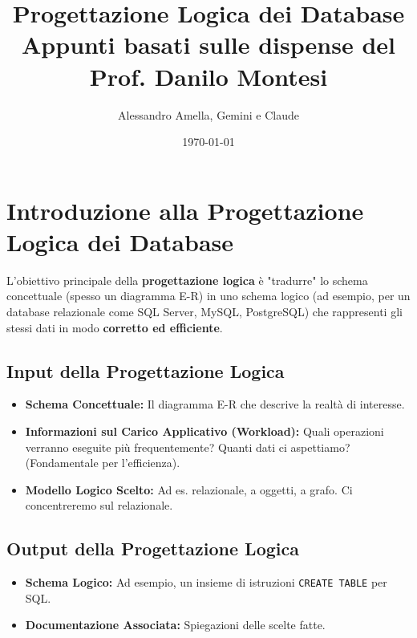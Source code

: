 

\usepackage{hyperref}

\title{Progettazione Logica dei Database\\
  \large Appunti basati sulle dispense del Prof. Danilo Montesi}
\author{Alessandro Amella, Gemini e Claude}
\date{\today}


	
	\maketitle
	\tableofcontents
	\newpage
	
	\section{Introduzione alla Progettazione Logica dei Database}
	L'obiettivo principale della \textbf{progettazione logica} è "tradurre" lo schema concettuale (spesso un diagramma E-R) in uno schema logico (ad esempio, per un database relazionale come SQL Server, MySQL, PostgreSQL) che rappresenti gli stessi dati in modo \textbf{corretto ed efficiente}.
	
	\subsection{Input della Progettazione Logica}
	\begin{itemize}
		\item \textbf{Schema Concettuale:} Il diagramma E-R che descrive la realtà di interesse.
		\item \textbf{Informazioni sul Carico Applicativo (Workload):} Quali operazioni verranno eseguite più frequentemente? Quanti dati ci aspettiamo? (Fondamentale per l'efficienza).
		\item \textbf{Modello Logico Scelto:} Ad es. relazionale, a oggetti, a grafo. Ci concentreremo sul relazionale.
	\end{itemize}
	
	\subsection{Output della Progettazione Logica}
	\begin{itemize}
		\item \textbf{Schema Logico:} Ad esempio, un insieme di istruzioni \texttt{CREATE TABLE} per SQL.
		\item \textbf{Documentazione Associata:} Spiegazioni delle scelte fatte.
	\end{itemize}
	
